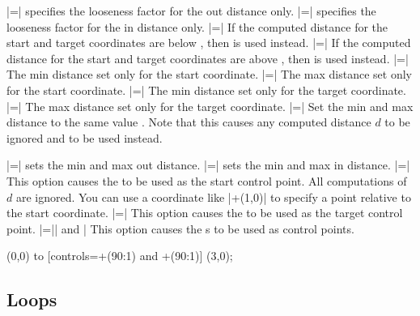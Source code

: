 \begin{itemize}
  |=|
  specifies the looseness factor for the out distance only. 
  |=|
  specifies the looseness factor for the in distance only.
  |=|
  If the computed distance for the start and target coordinates are
  below , then  is used instead.
  |=|
  If the computed distance for the start and target coordinates are
  above , then  is used instead.
  |=|
  The min distance set only for the start coordinate.
  |=|
  The max distance set only for the start coordinate.
  |=|
  The min distance set only for the target coordinate.
  |=|
  The max distance set only for the target coordinate.
  |=|
  Set the min and max distance to the same value . Note
  that this causes any computed distance $d$ to be ignored and
   to be used instead.
\begin{codeexample}[]
\end{codeexample}
  |=|
  sets the min and max out distance.
  |=|
  sets the min and max in distance.
  |=|
  This option causes the  to be used as the start
  control point. All computations of $d$ are ignored. You can use a
  coordinate like |+(1,0)| to specify a point relative to the start
  coordinate. 
  |=|
  This option causes the  to be used as the target
  control point.
  |=|| and |
  This option causes the s to be used as control
  points. 
\begin{codeexample}[]
\tikz \draw (0,0) to [controls=+(90:1) and +(90:1)] (3,0);
\end{codeexample}
\end{itemize}


\subsection{Loops}

